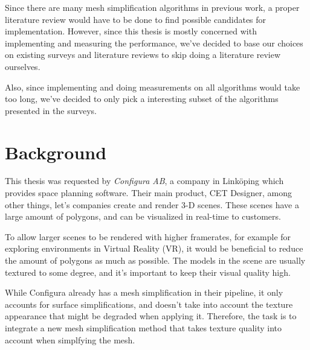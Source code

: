 Since there are many mesh simplification algorithms in previous work, a proper literature review would have to be done to find possible candidates for implementation. However, since this thesis is mostly concerned with implementing and measuring the performance, we've decided to base our choices on existing surveys and literature reviews to skip doing a literature review ourselves.

Also, since implementing and doing measurements on all algorithms would take too long, we've decided to only pick a interesting subset of the algorithms presented in the surveys.

\section{Background}
\label{sec:background}

This thesis was requested by \emph{Configura AB}, a company in Linköping which provides space planning software. Their main product, CET Designer, among other things, let's companies create and render 3-D scenes. These scenes have a large amount of polygons, and can be visualized in real-time to customers.

To allow larger scenes to be rendered with higher framerates, for example for exploring environments in Virtual Reality (VR), it would be beneficial to reduce the amount of polygons as much as possible. The models in the scene are usually textured to some degree, and it's important to keep their visual quality high.

While Configura already has a mesh simplification in their pipeline, it only accounts for surface simplifications, and doesn't take into account the texture appearance that might be degraded when applying it. Therefore, the task is to integrate a new mesh simplification method that takes texture quality into account when simplfying the mesh. 



